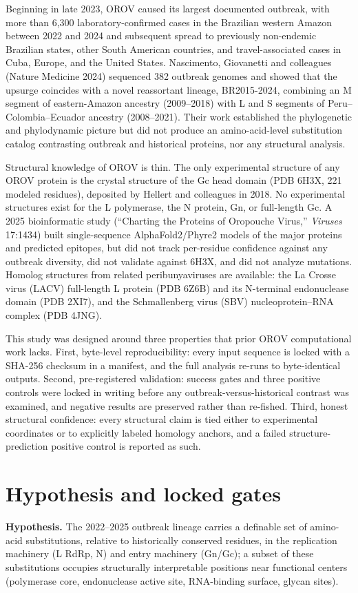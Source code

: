 \documentclass[12pt]{article}
\begin{document}
Beginning in late 2023, OROV caused its largest documented outbreak, with more than 6,300 laboratory-confirmed cases in the Brazilian western Amazon between 2022 and 2024 and subsequent spread to previously non-endemic Brazilian states, other South American countries, and travel-associated cases in Cuba, Europe, and the United States. Nascimento, Giovanetti and colleagues (Nature Medicine 2024) sequenced 382 outbreak genomes and showed that the upsurge coincides with a novel reassortant lineage, BR2015-2024, combining an M segment of eastern-Amazon ancestry (2009--2018) with L and S segments of Peru--Colombia--Ecuador ancestry (2008--2021). Their work established the phylogenetic and phylodynamic picture but did not produce an amino-acid-level substitution catalog contrasting outbreak and historical proteins, nor any structural analysis.

Structural knowledge of OROV is thin. The only experimental structure of any OROV protein is the crystal structure of the Gc head domain (PDB 6H3X, 221 modeled residues), deposited by Hellert and colleagues in 2018. No experimental structures exist for the L polymerase, the N protein, Gn, or full-length Gc. A 2025 bioinformatic study (``Charting the Proteins of Oropouche Virus,'' \textit{Viruses} 17:1434) built single-sequence AlphaFold2/Phyre2 models of the major proteins and predicted epitopes, but did not track per-residue confidence against any outbreak diversity, did not validate against 6H3X, and did not analyze mutations. Homolog structures from related peribunyaviruses are available: the La Crosse virus (LACV) full-length L protein (PDB 6Z6B) and its N-terminal endonuclease domain (PDB 2XI7), and the Schmallenberg virus (SBV) nucleoprotein--RNA complex (PDB 4JNG).

This study was designed around three properties that prior OROV computational work lacks. First, byte-level reproducibility: every input sequence is locked with a SHA-256 checksum in a manifest, and the full analysis re-runs to byte-identical outputs. Second, pre-registered validation: success gates and three positive controls were locked in writing before any outbreak-versus-historical contrast was examined, and negative results are preserved rather than re-fished. Third, honest structural confidence: every structural claim is tied either to experimental coordinates or to explicitly labeled homology anchors, and a failed structure-prediction positive control is reported as such.

\section{Hypothesis and locked gates}
\textbf{Hypothesis.} The 2022--2025 outbreak lineage carries a definable set of amino-acid substitutions, relative to historically conserved residues, in the replication machinery (L RdRp, N) and entry machinery (Gn/Gc); a subset of these substitutions occupies structurally interpretable positions near functional centers (polymerase core, endonuclease active site, RNA-binding surface, glycan sites).
\end{document}
